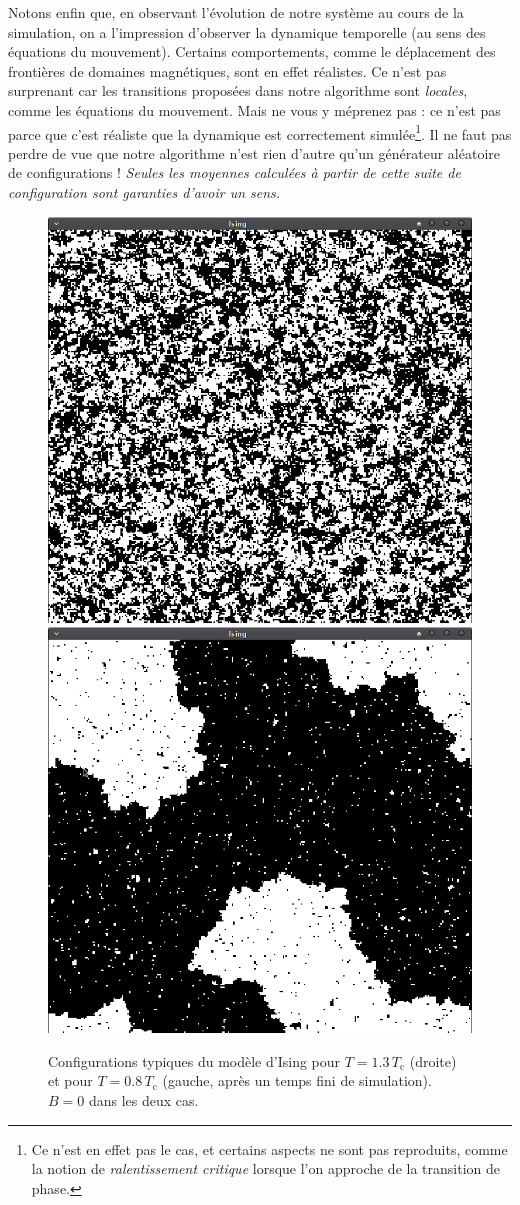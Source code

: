 \documentclass{book}
\begin{document}
Notons enfin que, en observant l'évolution de notre système au cours de la simulation, on a l'impression d'observer la dynamique temporelle (au sens des équations du mouvement). Certains comportements, comme le déplacement des frontières de domaines magnétiques, sont en effet réalistes. Ce n'est pas surprenant car les transitions proposées dans notre algorithme sont \emph{locales}, comme les équations du mouvement. Mais ne vous y méprenez pas : ce n'est pas parce que c'est réaliste que la dynamique est correctement simulée\footnote{Ce n'est en effet pas le cas, et certains aspects ne sont pas reproduits, comme la notion de \emph{ralentissement critique} lorsque l'on approche de la transition de phase.}. Il ne faut pas perdre de vue que notre algorithme n'est rien d'autre qu'un générateur aléatoire de configurations ! \emph{Seules les moyennes calculées à partir de cette suite de configuration sont garanties d'avoir un sens.}

\begin{figure}[H]
\centering
\includegraphics[width=0.48\linewidth]{TD3/T_sur_Tc_1.3.png}
\includegraphics[width=0.48\linewidth]{TD3/T_sur_Tc_0.8.png}
\caption{Configurations typiques du modèle d'Ising pour $T = 1.3\, T_\text{c}$ (droite) et pour $T = 0.8\, T_\text{c}$ (gauche, après un temps fini de simulation). $B=0$ dans les deux cas.}
\label{fig:configs_ising}
\end{figure}
\end{document}

